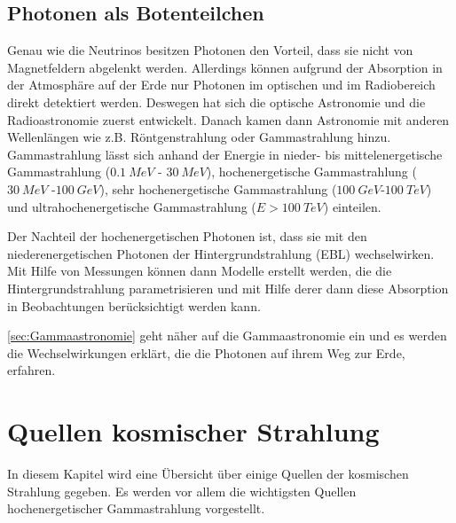 \subsection{Photonen als Botenteilchen}
Genau wie die Neutrinos besitzen Photonen den Vorteil, dass sie nicht von Magnetfeldern abgelenkt werden.
Allerdings können aufgrund der Absorption in der Atmosphäre auf der Erde nur Photonen im optischen und im Radiobereich direkt detektiert werden.
Deswegen hat sich die optische Astronomie und die Radioastronomie zuerst entwickelt. 
Danach kamen dann Astronomie mit anderen Wellenlängen wie z.B. Röntgenstrahlung oder Gammastrahlung hinzu.
Gammastrahlung lässt sich anhand der Energie in nieder- bis mittelenergetische Gammastrahlung ($\SI{0,1}{MeV}$ - $\SI{30}{MeV}$), hochenergetische Gammastrahlung ($\SI{30}{MeV}$ -$\SI{100}{GeV}$), sehr hochenergetische Gammastrahlung ($\SI{100}{GeV}$-$\SI{100}{TeV}$) und ultrahochenergetische Gammastrahlung ($E>\SI{100}{TeV}$) einteilen.


Der Nachteil der hochenergetischen Photonen ist, dass sie mit den niederenergetischen Photonen der Hintergrundstrahlung (EBL) wechselwirken.
Mit Hilfe von Messungen können dann Modelle erstellt werden, die die Hintergrundstrahlung parametrisieren und mit Hilfe derer dann diese Absorption in Beobachtungen berücksichtigt werden kann.


\autoref{sec:Gammaastronomie} geht näher auf die Gammaastronomie ein und es werden die Wechselwirkungen erklärt, die die Photonen auf ihrem Weg zur Erde, erfahren.


\section{Quellen kosmischer Strahlung}
\label{sec:Quellen}
In diesem Kapitel wird eine Übersicht über einige Quellen der kosmischen Strahlung gegeben.
Es werden vor allem die wichtigsten Quellen hochenergetischer Gammastrahlung vorgestellt.

